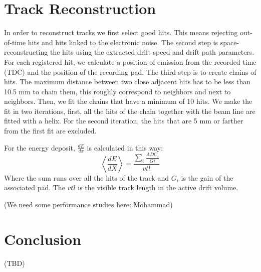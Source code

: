 \documentclass[reprint, amsmath,amssymb, aps]{revtex4-1}
\begin{document}
\section{Track Reconstruction}

In order to reconstruct tracks we first select good hits. This means rejecting out-of-time hits and hits linked to the electronic noise. The second step is space-reconstructing the hits using the extracted drift speed and drift path parameters. For each registered hit, we calculate a position of emission from the recorded time (TDC) and the position of the recording pad. The third step is to create chains of hits. The maximum distance between two close adjacent hits has to be less than 10.5 mm to chain them, this roughly correspond to neighbors and next to neighbors. Then, we fit the chains that have a minimum of 10 hits. We make the fit in two iterations, first, all the hits of the chain together with the beam line are fitted with a helix. For the second iteration, the hits that are 5 mm or farther from the first fit are excluded.

For the energy deposit, $\frac{dE}{dx}$ is calculated in this way:
\begin{equation}
 \left\langle \frac{dE}{dX} \right\rangle= \frac{\sum\limits_{i} \frac{ADC_{i}}{Gi}}{vtl}
\end{equation}
Where the sum runs over all the hits of the track and $G_{i}$ is the gain of the associated pad. The $vtl$ is the visible track length in the active drift volume. 

(We need some performance studies here: Mohammad)

\section{Conclusion}

(TBD)
\end{document}
